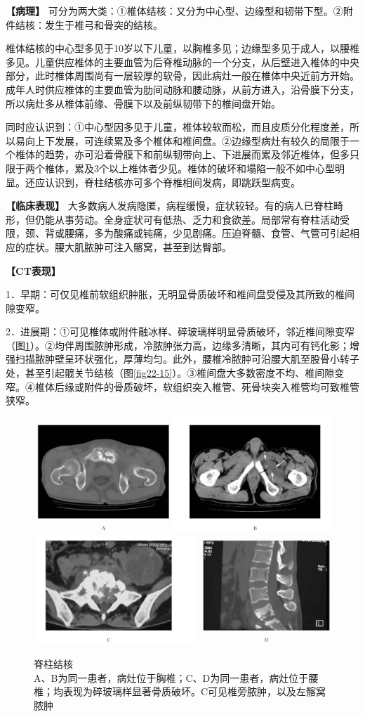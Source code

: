 \textbf{【病理】}
可分为两大类：①椎体结核：又分为中心型、边缘型和韧带下型。②附件结核：发生于椎弓和骨突的结核。

椎体结核的中心型多见于10岁以下儿童，以胸椎多见；边缘型多见于成人，以腰椎多见。儿童供应椎体的主要血管为后脊椎动脉的一个分支，从后壁进入椎体的中央部分，此时椎体周围尚有一层较厚的软骨，因此病灶一般在椎体中央近前方开始。成年人时供应椎体的主要血管为肋间动脉和腰动脉，从前方进入，沿骨膜下分支，所以病灶多从椎体前缘、骨膜下以及前纵韧带下的椎间盘开始。

同时应认识到：①中心型因多见于儿童，椎体较软而松，而且皮质分化程度差，所以易向上下发展，可连续累及多个椎体和椎间盘。②边缘型病灶有较久的局限于一个椎体的趋势，亦可沿着骨膜下和前纵韧带向上、下进展而累及邻近椎体，但多只限于两个椎体，累及3个以上椎体者少见。椎体的破坏和塌陷一般不如中心型明显。还应认识到，脊柱结核亦可多个脊椎相间发病，即跳跃型病变。

\textbf{【临床表现】}
大多数病人发病隐匿，病程缓慢，症状较轻。有的病人已脊柱畸形，但仍能从事劳动。全身症状可有低热、乏力和食欲差。局部常有脊柱活动受限，颈、背或腰痛，多为酸痛或钝痛，少见剧痛。压迫脊髓、食管、气管可引起相应的症状。腰大肌脓肿可注入髂窝，甚至到达臀部。

\textbf{【CT表现】}

1．早期：可仅见椎前软组织肿胀，无明显骨质破坏和椎间盘受侵及其所致的椎间隙变窄。

2．进展期：①可见椎体或附件融冰样、碎玻璃样明显骨质破坏，邻近椎间隙变窄（图\ref{fig22-14}）。②均伴周围脓肿形成，冷脓肿张力高，边缘多清晰，其内可有钙化影；增强扫描脓肿壁呈环状强化，厚薄均匀。此外，腰椎冷脓肿可沿腰大肌至股骨小转子处，甚至引起髋关节结核（图\ref{fig22-15}）。③椎间盘大多数密度不均、椎间隙变窄。④椎体后缘或附件的骨质破坏，软组织突入椎管、死骨块突入椎管均可致椎管狭窄。



\begin{figure}[!htbp]
 \centering
 \includegraphics[width=.7\textwidth,height=\textheight,keepaspectratio]{./images/Image00430.jpg}
 \includegraphics[width=.7\textwidth,height=\textheight,keepaspectratio]{./images/Image00431.jpg}
 \captionsetup{justification=centering}
 \caption{脊柱结核\\{\small A、B为同一患者，病灶位于胸椎；C、D为同一患者，病灶位于腰椎；均表现为碎玻璃样显著骨质破坏。C可见椎旁脓肿，以及左髂窝脓肿}}
 \label{fig22-14}
  \end{figure} 

